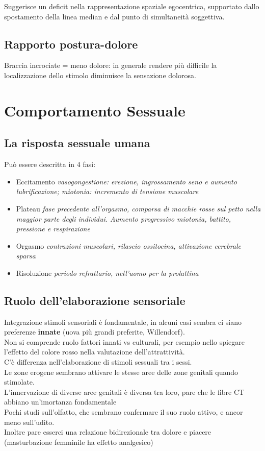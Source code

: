 \documentclass[12pt, a4paper]{article}
\begin{document}
Suggerisce un deficit nella rappresentazione spaziale egocentrica, supportato dallo spostamento della linea median e dal punto di simultaneità soggettiva.

\subsection{Rapporto postura-dolore} 

Braccia incrociate = meno dolore: in generale rendere più difficile la localizzazione dello stimolo diminuisce la sensazione dolorosa.

\section{Comportamento Sessuale}

\subsection{La risposta sessuale umana} 

Può essere descritta in 4 fasi:

\begin{itemize}
    \item Eccitamento \emph{vasogongestione: erezione, ingrossamento seno e aumento lubrificazione; miotonia: incremento di tensione muscolare} 
    \item Plateau \emph{fase precedente all'orgasmo, comparsa di macchie rosse sul petto nella maggior parte degli individui. Aumento progressivo miotonia, battito, pressione e respirazione}
    \item Orgasmo \emph{contrazioni muscolari, rilascio ossitocina, attivazione cerebrale sparsa} 
    \item Risoluzione \emph{periodo refrattario, nell'uomo per la prolattina} 
\end{itemize}

\subsection{Ruolo dell'elaborazione sensoriale} 

Integrazione stimoli sensoriali è fondamentale, in alcuni casi sembra ci siano preferenze \textbf{innate} (uova più grandi preferite, Willendorf).
\medskip\\ 
Non si comprende ruolo fattori innati vs culturali, per esempio nello spiegare l'effetto del colore rosso nella valutazione dell'attrattività.
\medskip\\ 
C'è differenza nell'elaborazione di stimoli sessuali tra i sessi.
\medskip\\ 
Le zone erogene sembrano attivare le stesse aree delle zone genitali quando stimolate.
\medskip\\ 
L'innervazione di diverse aree genitali è diversa tra loro, pare che le fibre CT abbiano un'imortanza fondamentale
\medskip\\  
Pochi studi sull'olfatto, che sembrano confermare il suo ruolo attivo, e ancor meno sull'udito.
\medskip\\  
Inoltre pare esserci una relazione bidirezionale tra dolore e piacere (masturbazione femminile ha effetto analgesico)
\end{document}
